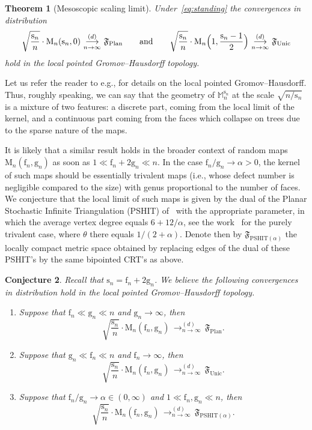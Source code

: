 \documentclass[11pt]{article}
\newcommand{\ie}{i.e.,\xspace}
\newcommand{\eg}{e.g.,\xspace}
\theoremstyle{plain}
\newtheorem{theorem}{Theorem}
\newtheorem{conjecture}[theorem]{Conjecture}
\theoremstyle{definition}
\theoremstyle{remark}
\newcommand{\Map}{\mathrm{M}}
\newcommand{\Mapb}{\mathbb{M}}
\newcommand{\face}{\mathrm{f}}
\newcommand{\gen}{\mathrm{g}}
\newcommand{\spar}{\mathrm{s}}
\newcommand{\cvloi}[1][n]{\,\mathop{\longrightarrow}^{(d)}_{#1 \to \infty}\,}
\begin{document}
\begin{theorem}[Mesoscopic scaling limit]
\label{thm:intermediate}
Under~\eqref{eq:standing} the convergences in distribution
\[
\sqrt{ \frac{\spar_{n}}{n}} \cdot \Map_{n}(\spar_{n},0) \cvloi \mathfrak{F}_{ \mathrm{Plan}}
\qquad \text{and} \qquad
\sqrt{ \frac{\spar_{n}}{n}} \cdot \Map_{n}\Bigl(1,\frac{\spar_{n}-1}{2} \Bigr) \cvloi \mathfrak{F}_{ \mathrm{Unic}}
\]
hold in the local pointed Gromov--Hausdorff topology.
\end{theorem}

Let us refer the reader to \eg \cite{BBI01,CLG14,BMR19} for details on the local pointed Gromov--Hausdorff. Thus, roughly speaking, we can say that the geometry of $ \Mapb_n^{\spar_n}$ at the scale $ \sqrt{n/\spar_n}$ is a mixture of two features: a discrete part, coming from the local limit of the kernel, and a continuous part coming from the faces which collapse on trees due to the sparse nature of the maps.

It is likely that a similar result holds in the broader context of random maps $\Map_n(\face_n, \gen_n)$ as soon as
$1 \ll \face_n+2 \gen_n \ll n$.
In the case $\face_n/\gen_n \rightarrow \alpha>0$, the kernel of such maps should be essentially trivalent maps (\ie whose defect number is negligible compared to the size) with genus proportional to the number of faces. We conjecture that the local limit of such maps is given by the dual of the Planar Stochastic Infinite Triangulation (PSHIT) of~\cite{Cur16} with the appropriate parameter, in which the average vertex degree equals $6+12/\alpha$, see the work~\cite{BL21} for the purely trivalent case, where $\theta$ there equals $1/(2+\alpha)$. Denote then by $\mathfrak{F}_{ \mathrm{PSHIT}(\alpha)}$ the locally compact metric space obtained by replacing edges of the dual of these PSHIT's by the same bipointed CRT's as above.

\begin{conjecture}\label{conjecture:general_thm}
Recall that $\spar_{n} = \face_n+2 \gen_n$.
We believe the following convergences in distribution hold in the local pointed Gromov--Hausdorff topology.
\begin{enumerate}
\item Suppose that $\face_n \ll \gen_n \ll n$ and $\gen_n \to \infty$, then
\[
\sqrt{ \frac{\spar_{n}}{n}} \cdot \Map_{n}(\face_n, \gen_n) \cvloi \mathfrak{F}_{ \mathrm{Plan}}.
\]

\item Suppose that $\gen_n \ll \face_n \ll n$ and $\face_n \to \infty$, then
\[
\sqrt{ \frac{\spar_{n}}{n}} \cdot \Map_{n}(\face_n, \gen_n) \cvloi \mathfrak{F}_{ \mathrm{Unic}}.
\]

\item Suppose that $\face_n/\gen_n \rightarrow \alpha \in (0,\infty)$ and $1 \ll \face_n,\gen_n \ll n$, then
\[
\sqrt{ \frac{\spar_{n}}{n}} \cdot \Map_{n}(\face_n, \gen_n) \cvloi \mathfrak{F}_{ \mathrm{PSHIT}(\alpha)}.
\]
\end{enumerate}
\end{conjecture}
\end{document}
